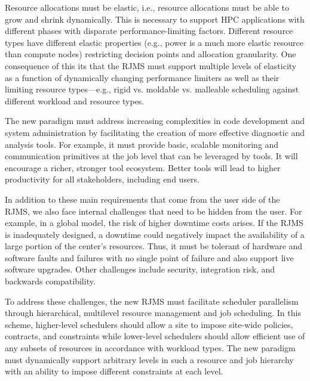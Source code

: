 Resource allocations
must be elastic, i.e., resource allocations must be able to grow and shrink
dynamically. This is necessary to support HPC applications with different
phases with disparate performance-limiting factors.
Different resource types have different
elastic properties 
(e.g., power is a much more elastic resource than compute nodes)
restricting decision points and allocation granularity.
One consequence of this its that the RJMS must 
support multiple levels of elasticity~\cite{Convergence} 
as a function of dynamically changing performance limiters
as well as their limiting resource types---e.g., 
rigid vs. moldable vs. malleable scheduling 
against different workload and resource types.

The new paradigm must address increasing complexities
in code development and system administration by facilitating
the creation of more effective diagnostic and analysis tools.
For example, it must provide basic, scalable monitoring and communication
primitives at the job level that can be leveraged by tools.
It will encourage a richer, stronger tool ecosystem.
Better tools will lead to higher productivity for all
stakeholders, including end users.

In addition to these main requirements that come from the user side
of the RJMS, we also face internal challenges that need to be hidden
from the user. 
For example, in a global model,
the risk of higher downtime costs arises. 
If the RJMS is inadequately designed, a downtime could negatively
impact the availability of a large portion of the center's
resources. Thus, it must be tolerant of hardware and software
faults and failures with no single point of failure and 
also support live software upgrades. 
Other challenges include security, integration risk, 
and backwards compatibility. 

%

To address these challenges, %
the new RJMS must facilitate scheduler
parallelism~\cite{Omega,Mesos} through hierarchical,
multilevel resource management and job scheduling.
In this scheme, higher-level schedulers
should allow a site to impose site-wide policies, contracts,
and constraints while lower-level schedulers should allow
efficient use of any subsets of resources in accordance with
workload types.
The new paradigm must dynamically support arbitrary levels in
such a resource and job hierarchy with an ability to impose
different constraints at each level.


